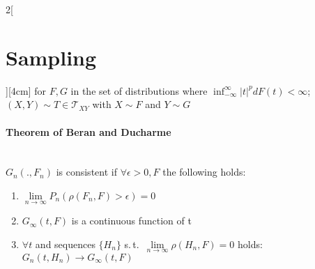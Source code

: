 \documentclass[8pt]{extarticle}
\begin{document}
\begin{multicols}{2}[\section{Sampling}][4cm]
\noindent for $F,G$ in the set of distributions where $\inf_{-\infty}^\infty |t|^pdF(t) <\infty$; $(X,Y) \sim T \in\mathcal{T}_{XY}$ with $X\sim F$ and $Y\sim G$

\paragraph{Theorem of Beran and Ducharme} \ \\

$G_n (., F_n)$ is consistent if $\forall \epsilon > 0, F$ the following holds:

\begin{enumerate}
\item $\underset{n\rightarrow\infty}{\lim}P_n(\rho(F_n,F)>\epsilon)=0$
\item $G_\infty(t,F)$ is a continuous function of t
\item $\forall t$ and sequences $\{H_n\}$ s.\,t.\ $\underset{n\rightarrow\infty}{\lim}\rho(H_n,F)=0$ holds: $G_n(t,H_n) \rightarrow G_\infty(t,F)$
\end{enumerate}


\end{multicols}
\end{document}
